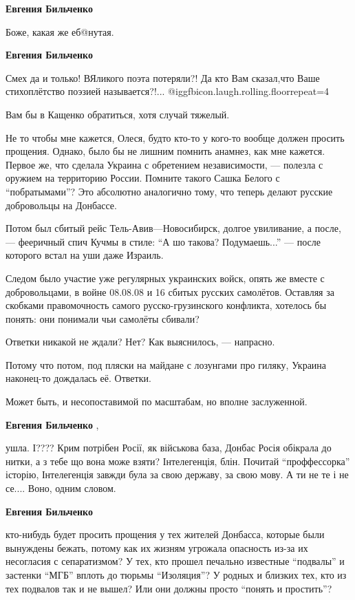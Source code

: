 \begin{itemize}
\begin{itemize}
\textbf{Евгения Бильченко} 


Боже, какая же еб@нутая.

\textbf{Евгения Бильченко} 

Смех да и только! ВЯликого поэта потеряли?! Да кто Вам сказал,что Ваше
стихоплётство поэзией называется?!... @igg{fbicon.laugh.rolling.floor}{repeat=4} 

Вам бы в Кащенко обратиться, хотя случай тяжелый.


Не то чтобы мне кажется, Олеся, будто кто-то у кого-то вообще должен просить
прощения. Однако, было бы не лишним помнить анамнез, как мне кажется. Первое
же, что сделала Украина с обретением независимости, — полезла с оружием на
территорию России. Помните такого Сашка Белого с \enquote{побратымами}? Это абсолютно
аналогично тому, что теперь делают русские добровольцы на Донбассе.

Потом был сбитый рейс Тель-Авив—Новосибирск, долгое увиливание, а после, —
фееричный спич Кучмы в стиле: \enquote{А шо такова? Подумаешь...} — после которого
встал на уши даже Израиль.

Следом было участие уже регулярных украинских войск, опять же вместе с
добровольцами, в войне 08.08.08 и 16 сбитых русских самолётов. Оставляя за
скобками правомочность самого русско-грузинского конфликта, хотелось бы понять:
они понимали чьи самолёты сбивали?

Ответки никакой не ждали? Нет? Как выяснилось, — напрасно.

Потому что потом, под пляски на майдане с лозунгами про гиляку, Украина
наконец-то дождалась её. Ответки.

Может быть, и несопоставимой по масштабам, но вполне заслуженной.

\textbf{Евгения Бильченко} ,

ушла. І???? Крим потрібен Росії, як військова база, Донбас Росія обікрала до
нитки, а з тебе що вона може взяти? Інтелегенція, блін. Почитай
\enquote{проффессорка} історію, Інтелегенція завжди була за свою державу, за свою мову. А
ти не те і не се.... Воно, одним словом.

\textbf{Евгения Бильченко} 

кто-нибудь будет просить прощения у тех жителей Донбасса, которые были
вынуждены бежать, потому как их жизням угрожала опасность из-за их несогласия с
сепаратизмом? У тех, кто прошел печально известные \enquote{подвалы} и застенки \enquote{МГБ}
вплоть до тюрьмы \enquote{Изоляция}? У родных и близких тех, кто из тех подвалов так и
не вышел? Или они должны просто \enquote{понять и простить}?


\end{itemize}
\end{itemize}
